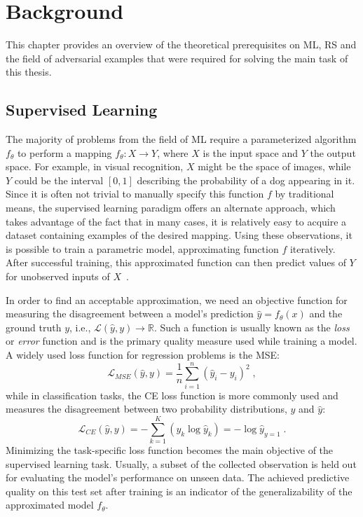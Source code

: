 \chapter{Background}
\label{chp:background}
This chapter provides an overview of the theoretical prerequisites on \ac{ML}, \ac{RS} and the field of adversarial examples that were required for solving the main task of this thesis.

\section{Supervised Learning}
\label{sec:supervised}
The majority of problems from the field of \ac{ML} require a parameterized algorithm $f_\theta$ to perform a mapping $f_\theta: X \to Y $, where $ X $ is the input space and $Y$ the output space. For example, in visual recognition, $ X $ might be the space of images, while $ Y $ could be the interval $[0,1]$ describing the probability of a dog appearing in it. Since it is often not trivial to manually specify this function $f$ by traditional means, the supervised learning paradigm offers an alternate approach, which takes advantage of the fact that in many cases, it is relatively easy to acquire a dataset containing examples of the desired mapping. Using these observations, it is possible to train a parametric model, approximating function $f$ iteratively. After successful training, this approximated function can then predict values of $Y$ for unobserved inputs of \(X\)~\parencite{Karpathy:2016}.

In order to find an acceptable approximation, we need an objective function for measuring the disagreement between a model's prediction $\hat{y} = f_\theta(x)$ and the ground truth $y$, i.e., $\mathcal{L}(\hat{y},y) \rightarrow \mathbb{R}$. Such a function is usually known as the \textit{loss} or \textit{error} function and is the primary quality measure used while training a model. A widely used loss function for regression problems is the \ac{MSE}:
\begin{equation}
\mathcal{L}_{MSE}(\hat{y}, y)=\frac{1}{n}\sum_{i=1}^n(\hat{y}_i-y_i)^2\;,
\end{equation}
while in classification tasks, the \ac{CE} loss function is more commonly used and measures the disagreement between two probability distributions, $y$ and $\hat{y}$:
\begin{equation}
\mathcal{L}_{CE}(\hat{y}, y)=-\sum_{k=1}^K(y_k \log \hat{y}_k) = -\log \hat{y}_{y=1}\;.
\end{equation}
Minimizing the task-specific loss function becomes the main objective of the supervised learning task. Usually, a subset of the collected observation is held out for evaluating the model's performance on unseen data. The achieved predictive quality on this test set after training is an indicator of the generalizability of the approximated model $f_\theta$.
